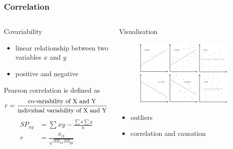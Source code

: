 \documentclass[10pt, compress]{beamer}
\begin{document}
\begin{frame}
    \frametitle{Correlation}
    \begin{columns}
        \begin{block}{Covariability}
            \begin{itemize}
                \item \alert{linear} relationship between two variables $x$ and $y$
                \item positive and negative
            \end{itemize}
            Pearson correlation is defined as
            \begin{equation}
                \small
                r = \frac{\text{co-variability of X and Y}}{\text{individual variability of X and Y}}
            \end{equation}
            \begin{align}
                SP_{xy} & = \sum xy - \frac{\sum x \sum y}{n} \\
                r &= \frac{S_{xy}}{\sqrt{SS_{xx}SS_{yy}}}
            \end{align}
        \end{block}
        \begin{block}{Visualisation}
            \begin{figure}
                \begin{center}
                    \includegraphics[scale=0.2]{img/correlationcoefficient.png}
                \end{center}
            \end{figure}
            \begin{itemize}
                \item \alert{outliers}
                \item \alert{correlation and causation}
            \end{itemize}
        \end{block}
    \end{columns}
\end{frame}
\end{document}

